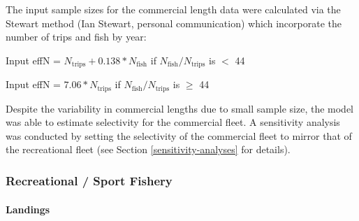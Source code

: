 \documentclass[11pt,
  english,
  letterpaper,
]{article}
\begin{document}
\leavevmode\tagmcend\tagstructend\par


The input sample sizes for the commercial length data were calculated via the Stewart method (Ian Stewart, personal communication) which incorporate the number of trips and fish by year:

\leavevmode\tagmcend\tagstructend\par

\begin{centering}

Input effN = $N_{\text{trips}} + 0.138 * N_{\text{fish}}$ if $N_{\text{fish}}/N_{\text{trips}}$ is $<$ 44

Input effN = $7.06 * N_{\text{trips}}$ if $N_{\text{fish}}/N_{\text{trips}}$ is $\geq$ 44

\end{centering}


Despite the variability in commercial lengths due to small sample size, the model was able to estimate selectivity for the commercial fleet. A sensitivity analysis was conducted by setting the selectivity of the commercial fleet to mirror that of the recreational fleet (see Section \ref{sensitivity-analyses} for details).

\leavevmode\tagmcend\tagstructend\par


\hypertarget{recreational-sport-fishery}{%
\subsubsection{Recreational / Sport Fishery}\label{recreational-sport-fishery}}

\leavevmode\tagmcend\tagstructend


\hypertarget{landings-1}{%
\paragraph{Landings}\label{landings-1}}

\leavevmode\tagmcend\tagstructend

\end{document}
